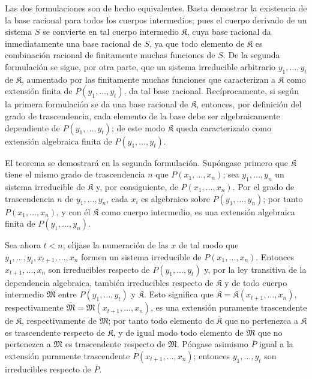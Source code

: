 \documentclass[11pt]{article}
\begin{document}
Las dos formulaciones son de hecho equivalentes. Basta demostrar la existencia de la base racional para todos los cuerpos intermedios; pues el cuerpo derivado de un sistema $S$ se convierte en tal cuerpo intermedio $\mathfrak K$, cuya base racional da inmediatamente una base racional de $S$, ya que todo elemento de $\mathfrak K$ es combinación racional de finitamente muchas funciones de $S$. De la segunda formulación se sigue, por otra parte, que un sistema irreducible arbitrario $y_1,\ldots,y_t$ de $\mathfrak K$, aumentado por las finitamente muchas funciones que caracterizan a $\mathfrak K$ como extensión finita de $P(y_1,\ldots,y_t)$, da tal base racional. Recíprocamente, si según la primera formulación se da una base racional de $\mathfrak K$, entonces, por definición del grado de trascendencia, cada elemento de la base debe ser algebraicamente dependiente de $P(y_1,\ldots,y_t)$; de este modo $\mathfrak K$ queda caracterizado como extensión algebraica finita de $P(y_1,\ldots,y_t)$.

El teorema se demostrará en la segunda formulación. Supóngase primero que $\mathfrak K$ tiene el mismo grado de trascendencia $n$ que $P(x_1,\ldots,x_n)$; sea $y_1,\ldots,y_n$ un sistema irreducible de $\mathfrak K$ y, por consiguiente, de $P(x_1,\ldots,x_n)$. Por el grado de trascendencia $n$ de $y_1,\ldots,y_n$, cada $x_i$ es algebraico sobre $P(y_1,\ldots,y_n)$; por tanto $P(x_1,\ldots,x_n)$, y con él $\mathfrak K$ como cuerpo intermedio, es una extensión algebraica finita de $P(y_1,\ldots,y_n)$.

Sea ahora $t<n$; elíjase la numeración de las $x$ de tal modo que $y_1,\ldots,y_t,x_{t+1},\ldots,x_n$ formen un sistema irreducible de $P(x_1,\ldots,x_n)$. Entonces $x_{t+1},\ldots,x_n$ son irreducibles respecto de $P(y_1,\ldots,y_t)$ y, por la ley transitiva de la dependencia algebraica, también irreducibles respecto de $\mathfrak K$ y de todo cuerpo intermedio $\mathfrak M$ entre $P(y_1,\ldots,y_t)$ y $\mathfrak K$. Esto significa que $\overline{\mathfrak K}=\mathfrak K(x_{t+1},\ldots,x_n)$, respectivamente $\overline{\mathfrak M}=\mathfrak M(x_{t+1},\ldots,x_n)$, es una extensión puramente trascendente de $\mathfrak K$, respectivamente de $\mathfrak M$; por tanto todo elemento de $\overline{\mathfrak K}$ que no pertenezca a $\mathfrak K$ es trascendente respecto de $\mathfrak K$, y de igual modo todo elemento de $\overline{\mathfrak M}$ que no pertenezca a $\mathfrak M$ es trascendente respecto de $\mathfrak M$. Póngase asimismo $\overline P$ igual a la extensión puramente trascendente $P(x_{t+1},\ldots,x_n)$; entonces $y_1,\ldots,y_t$ son irreducibles respecto de $\overline P$.
\end{document}
